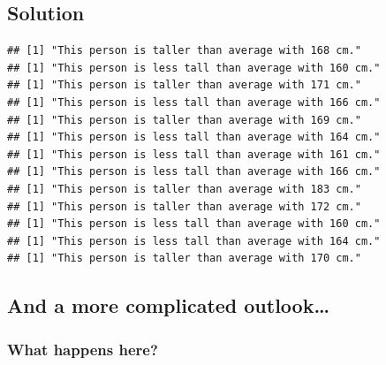 \documentclass[
]{book}
\newenvironment{Shaded}{\begin{snugshade}}{\end{snugshade}}
\newcommand{\ControlFlowTok}[1]{\textcolor[rgb]{0.13,0.29,0.53}{\textbf{#1}}}
\newcommand{\DecValTok}[1]{\textcolor[rgb]{0.00,0.00,0.81}{#1}}
\newcommand{\FunctionTok}[1]{\textcolor[rgb]{0.13,0.29,0.53}{\textbf{#1}}}
\newcommand{\NormalTok}[1]{#1}
\newcommand{\SpecialCharTok}[1]{\textcolor[rgb]{0.81,0.36,0.00}{\textbf{#1}}}
\newcommand{\StringTok}[1]{\textcolor[rgb]{0.31,0.60,0.02}{#1}}
\begin{document}
\subsection{Solution}\label{solution-8}

\begin{Shaded}
\end{Shaded}

\begin{verbatim}
## [1] "This person is taller than average with 168 cm."
## [1] "This person is less tall than average with 160 cm."
## [1] "This person is taller than average with 171 cm."
## [1] "This person is less tall than average with 166 cm."
## [1] "This person is taller than average with 169 cm."
## [1] "This person is less tall than average with 164 cm."
## [1] "This person is less tall than average with 161 cm."
## [1] "This person is less tall than average with 166 cm."
## [1] "This person is taller than average with 183 cm."
## [1] "This person is taller than average with 172 cm."
## [1] "This person is less tall than average with 160 cm."
## [1] "This person is less tall than average with 164 cm."
## [1] "This person is taller than average with 170 cm."
\end{verbatim}

\subsection{And a more complicated outlook\ldots{}}\label{and-a-more-complicated-outlook}

\subsubsection{What happens here?}\label{what-happens-here}
\end{document}
